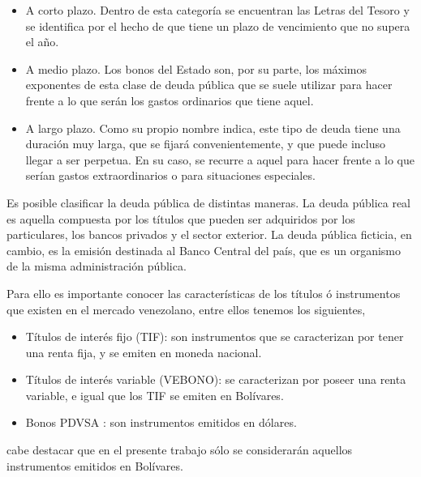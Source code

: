 \begin{itemize}
  \item A corto plazo. Dentro de esta categor\'ia se encuentran las Letras del Tesoro y se identifica por el hecho de que tiene un plazo de vencimiento que no supera el a\~no.
  \item A medio plazo. Los bonos del Estado son, por su parte, los m\'aximos exponentes de esta clase de deuda p\'ublica que se suele utilizar para hacer frente a lo que ser\'an los gastos ordinarios que tiene aquel.
  \item A largo plazo. Como su propio nombre indica, este tipo de deuda tiene una duraci\'on muy larga, que se fijar\'a convenientemente, y que puede incluso llegar a ser perpetua. En su caso, se recurre a aquel para hacer frente a lo que ser\'ian gastos extraordinarios o para situaciones especiales.
\end{itemize}


\hspace*{0.4 cm} Es posible clasificar la deuda p\'ublica de distintas maneras. La deuda p\'ublica real es aquella compuesta por los t\'itulos que pueden ser adquiridos por los particulares, los bancos privados y el sector exterior. La deuda p\'ublica ficticia, en cambio, es la emisi\'on destinada al Banco Central del pa\'is, que es un organismo de la misma administraci\'on p\'ublica.





\hspace*{0.4 cm} Para ello es importante conocer las caracter\'isticas de los t\'itulos \'o instrumentos que existen en el mercado venezolano, entre ellos tenemos los siguientes,

\vspace{0.4cm}

\begin{itemize}
  \item T\'itulos de inter\'es fijo (TIF): son instrumentos que se caracterizan por tener una renta fija, y se emiten en moneda nacional.
  \item T\'itulos de inter\'es variable (VEBONO): se caracterizan por poseer una renta variable, e igual que los TIF se emiten en Bol\'ivares.
  \item Bonos PDVSA : son instrumentos emitidos en d\'olares.
\end{itemize}

\vspace{0.5cm}

\noindent cabe destacar que en el presente trabajo s\'olo  se considerar\'an aquellos instrumentos emitidos en Bol\'ivares.

